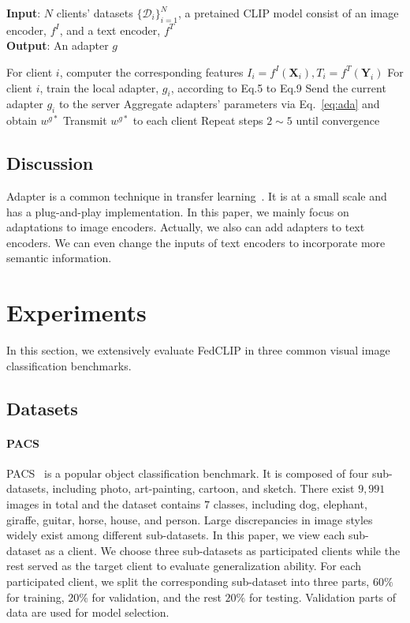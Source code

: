 \documentclass[11pt]{article}
\newcommand{\equationname}{Eq.}
\newcommand{\method}{FedCLIP\xspace}
\begin{document}
\begin{algorithm}[htb]
\caption{\method}
\label{alg:adafed}
\textbf{Input}: $N$ clients' datasets $\{\mathcal{D}_i\}_{i=1}^N$, a pretained CLIP model consist of an image encoder, $f^I$, and a text encoder, $f^T$\\
\textbf{Output}: An adapter $g$ 
\begin{algorithmic}[1] %
\State For client $i$, computer the corresponding features $I_i=f^I(\mathbf{X}_i), T_i=f^T(\mathbf{Y}_i)$
\State For client $i$, train the local adapter, $g_i$, according to \equationname 5 to \equationname 9
\State Send the current adapter $g_i$ to the server
\State Aggregate adapters' parameters via \equationname~\ref{eq:ada} and obtain $w^{g*}$
\State Transmit $w^{g*}$ to each client
\State Repeat steps $2 \sim 5$ until convergence
\end{algorithmic}
\end{algorithm}

\subsection{Discussion}
Adapter is a common technique in transfer learning~\cite{wenxinhou22}.
It is at a small scale and has a plug-and-play implementation.
In this paper, we mainly focus on adaptations to image encoders.
Actually, we also can add adapters to text encoders.
We can even change the inputs of text encoders to incorporate more semantic information.

\section{Experiments}
\label{sec:exp}

In this section, we extensively evaluate \method in three common visual image classification benchmarks.

\subsection{Datasets}
\paragraph{PACS} PACS~\cite{li2017deeper} is a popular object classification benchmark. 
It is composed of four sub-datasets, including photo, art-painting, cartoon, and sketch.
There exist $9,991$ images in total and the dataset contains $7$ classes, including dog, elephant, giraffe, guitar, horse, house, and person.
Large discrepancies in image styles widely exist among different sub-datasets.
In this paper, we view each sub-dataset as a client. 
We choose three sub-datasets as participated clients while the rest served as the target client to evaluate generalization ability.
For each participated client, we split the corresponding sub-dataset into three parts, $60\%$ for training, $20\%$ for validation, and the rest $20\%$ for testing.
Validation parts of data are used for model selection.
\end{document}
